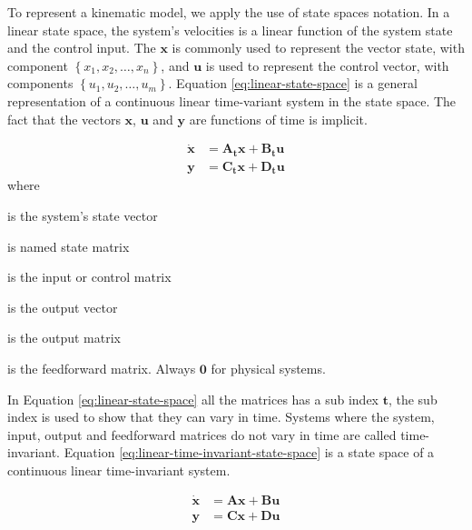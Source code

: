 \documentclass[12pt]{article}
\newcommand{\bvec}[1]{\mathbf{#1}} %
\newcommand{\mat}[1]{\mathbf{#1}}
\newcommand{\cbrac}[1]{\left\{#1\right\}} %
\begin{document}
To represent a kinematic model, we apply the use of state spaces notation. In a linear state space, the system's velocities is a linear function of the system state and the control input. The $\bvec{x}$ is commonly used to represent the vector state, with component $\cbrac{x_1, x_2, \dots, x_n}$, and $\bvec{u}$ is used to represent the control vector, with components $\cbrac{u_1, u_2, \dots, u_m}$. Equation \ref{eq:linear-state-space} is a general representation of a continuous linear time-variant system in the state space. The fact that the vectors $\bvec{x}$, $\bvec{u}$ and $\bvec{y}$ are functions of time is implicit.

\begin{equation}
    \begin{aligned}
        \bvec{\dot{x}} &= \mat{A_t} \bvec{x} + \mat{B_t} \bvec{u} \\
        \bvec{y} &= \mat{C_t} \bvec{x} + \mat{D_t} \bvec{u}
    \end{aligned}
    \label{eq:linear-state-space}
\end{equation}
\noindent where
\begin{description}[labelindent=10pt, labelsep=10pt]
    \item[$\bvec{x}$] is the system's state vector
    \item[$\mat{A_t}$] is named state matrix
    \item[$\mat{B_t}$] is the input or control matrix
    \item[$\bvec{y}$] is the output vector
    \item[$\mat{C_t}$] is the output matrix
    \item[$\mat{D_t}$] is the feedforward matrix. Always $\mat{0}$ for physical systems.
\end{description}

In Equation \ref{eq:linear-state-space} all the matrices has a sub index $\mathbf{t}$, the sub index is used to show that they can vary in time. Systems where the system, input, output and feedforward matrices do not vary in time are called time-invariant. Equation \ref{eq:linear-time-invariant-state-space} is a state space of a continuous linear time-invariant system.

\begin{equation}
    \begin{aligned}
        \bvec{\dot{x}} &= \mat{A} \bvec{x} + \mat{B} \bvec{u} \\
        \bvec{y} &= \mat{C} \bvec{x} + \mat{D} \bvec{u}
    \end{aligned}
    \label{eq:linear-time-invariant-state-space}
\end{equation}
\end{document}
